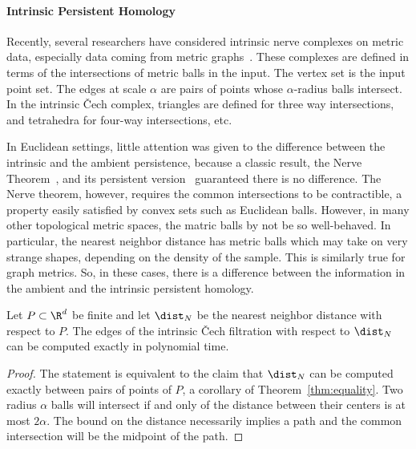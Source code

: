 

  \paragraph*{Intrinsic Persistent Homology}
    Recently, several researchers have considered intrinsic nerve complexes on metric data, especially data coming from metric graphs~\cite{adamszek16nerve,gasparovic17complete}.
    These complexes are defined in terms of the intersections of metric balls in the input.
    The vertex set is the input point set.
    The edges at scale $\alpha$ are pairs of points whose $\alpha$-radius balls intersect.
    In the intrinsic \v Cech complex, triangles are defined for three way intersections, and tetrahedra for four-way intersections, etc.

    In Euclidean settings, little attention was given to the difference between the intrinsic and the ambient persistence, because a classic result, the Nerve Theorem~\cite{borsuk48imbedding}, and its persistent version~\cite{chazal08towards} guaranteed there is no difference.
    The Nerve theorem, however, requires the common intersections to be contractible, a property easily satisfied by convex sets such as Euclidean balls.
    However, in many other topological metric spaces, the matric balls by not be so well-behaved.
    In particular, the nearest neighbor distance has metric balls which may take on very strange shapes, depending on the density of the sample.
    This is similarly true for graph metrics.
    So, in these cases, there is a difference between the information in the ambient and the intrinsic persistent homology.

    \begin{theorem}
      Let $P\subset \R^d$ be finite and let $\dist_N$ be the nearest neighbor distance with respect to $P$.
      The edges of the intrinsic \v Cech filtration with respect to $\dist_N$ can be computed exactly in polynomial time.
    \end{theorem}
    \begin{proof}
      The statement is equivalent to the claim that $\dist_N$ can be computed exactly between pairs of points of $P$, a corollary of Theorem~\ref{thm:equality}.
      Two radius $\alpha$ balls will intersect if and only of the distance between their centers is at most $2\alpha$.
      The bound on the distance necessarily implies a path and the common intersection will be the midpoint of the path.
    \end{proof}
